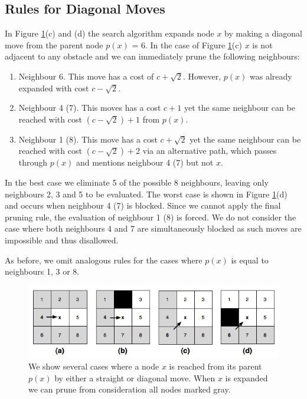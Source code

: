 \subsection{Rules for Diagonal Moves}
\label{sec:prunediagonal}
 In Figure \ref{fig:pruningrules}(c) and
(d) the search algorithm expands node $x$ by making a diagonal move from the
parent node $p(x)$ = 6.  In the case of Figure \ref{fig:pruningrules}(c) $x$ is
not adjacent to any obstacle and we can immediately prune the following
neighbours:

\begin{enumerate}

\item Neighbour 6. This move has a cost of $c + \sqrt2$. However, $p(x)$ was
already expanded with cost $c - \sqrt2$.

\item Neighbour 4 (7). This moves has a cost $c + 1$ yet the same neighbour can
be reached with cost $(c - \sqrt2) + 1$ from $p(x)$.

\item Neighbour 1 (8). This move has a cost $c + \sqrt2$ yet the same neighbour
can be reached with cost $(c - \sqrt2) + 2$ via an alternative path, which
passes through $p(x)$ and mentions neighbour 4 (7) but not $x$.

\end{enumerate}

\noindent In the best case we eliminate 5 of the possible 8 neighbours, leaving
only neighbours 2, 3 and 5 to be evaluated.  The worst case is shown in Figure
\ref{fig:pruningrules}(d) and occurs when neighbour 4 (7) is blocked. Since we
cannot apply the final pruning rule, the evaluation of neighbour 1 (8) is
forced.  We do not consider the case where both neighbours 4 and 7 are
simultaneously blocked as such moves are impossible and thus disallowed.

As before, we omit analogous rules for the cases where $p(x)$ is equal to
neighbours 1, 3 or 8.

\begin{figure}[tb]
       \begin{center}
		   \includegraphics[scale=0.4, trim = 10mm 10mm 10mm 0mm]{diagrams/pruningrules.png}
       \end{center}
	\vspace{-3pt}
       \caption{We show several cases where a node $x$ is reached from its
parent $p(x)$ by either a straight or diagonal move. When $x$ is expanded we can prune from consideration all nodes marked gray.}
       \label{fig:pruningrules}
\end{figure}


